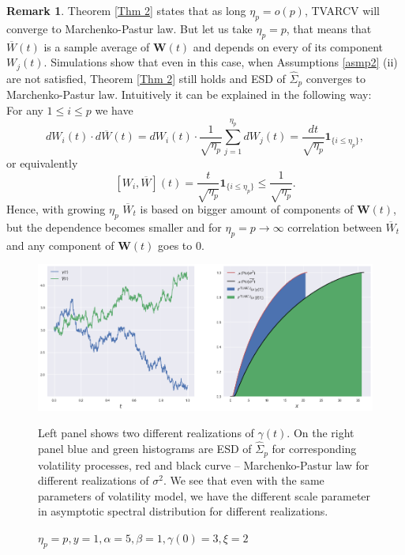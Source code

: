 \documentclass[a4paper,11pt]{book}
\theoremstyle{plain}
\theoremstyle{definition}
\newtheorem{rmrk}[thm]{Remark}
\begin{document}
    \begin{rmrk}
    	Theorem \ref{Thm 2} states that as long $\eta_p = o(p)$, TVARCV will converge to Marchenko-Pastur law. But let us take $\eta_p = p$, that means that $\overline{W}(t)$ is a sample average of $\mathbf{W}(t)$ and depends on every of its component $W_j(t)$. Simulations show that even in this case, when Assumptions \ref{asmp2} (ii) are not satisfied, Theorem \ref{Thm 2} still holds and ESD of $\widehat{\Sigma}_p$ converges to Marchenko-Pastur law. Intuitively it can be explained in the following way: \\
    	For any $1 \leq i \leq p$ we have
    	\[ dW_i(t) \cdot d\overline{W}(t) = dW_i(t) \cdot \frac{1}{\sqrt{\eta_p}} \sum_{j=1}^{\eta_p}dW_j(t) = \frac{dt}{\sqrt{\eta_p}} \mathbf{1}_{\{i \leq \eta_p\}}, \]
    	or equivalently 
    	\[ [W_i, \overline{W}](t) =  \frac{t}{\sqrt{\eta_p}} \mathbf{1}_{\{i \leq \eta_p\}} \leq \frac{1}{\sqrt{\eta_p}} .  \]
    	Hence, with growing $\eta_p$ $\overline{W}_t$ is based on bigger amount of components of $\mathbf{W}(t)$, but the dependence becomes smaller and for $\eta_p = p \rightarrow \infty$ correlation between $\overline{W}_t$ and any component of $\mathbf{W}(t)$ goes to $0$.
    \end{rmrk}
    
    \begin{figure}[ht]
    	\begin{center} \centering
    		\includegraphics[scale=0.4]{XCIR}
    		\caption{$\eta_p = p, y = 1, \alpha = 5, \beta = 1, \gamma(0) = 3, \xi = 2$}
    		\smallskip
    		\small
    		Left panel shows two different realizations of $\gamma(t)$. On the right panel blue and green histograms are ESD of $\widehat{\Sigma}_p$ for corresponding volatility processes, red and black curve -- Marchenko-Pastur law for different realizations of $\sigma^2$. We see that even with the same parameters of volatility model, we have the different scale parameter in asymptotic spectral distribution for different realizations.
    	\end{center}
    \end{figure}
    		
\end{document}
